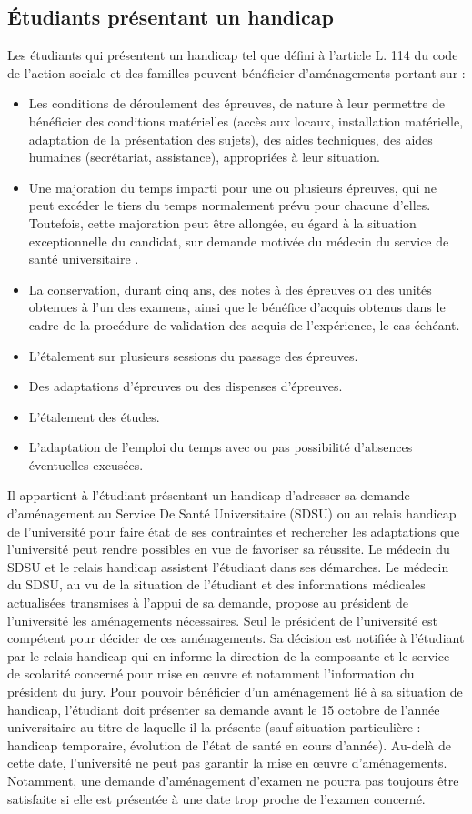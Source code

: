 \documentclass[a4paper,11pt]{article}
\begin{document}
\subsection{Étudiants présentant un handicap}\label{Handicap}
Les étudiants qui présentent un handicap tel que défini à l'article L. 114 du code de l'action sociale et des familles peuvent bénéficier d'aménagements portant sur :
\begin{itemize}
	\item Les conditions de déroulement des épreuves, de nature à leur permettre de bénéficier des conditions matérielles (accès aux locaux, installation matérielle, adaptation de la présentation des sujets), des aides techniques, des aides humaines (secrétariat, assistance), appropriées à leur situation.
	\item Une majoration du temps imparti pour une ou plusieurs épreuves, qui ne peut excéder le tiers du temps normalement prévu pour chacune d'elles. Toutefois, cette majoration peut être allongée, eu égard à la situation exceptionnelle du candidat, sur demande motivée du médecin du service de santé universitaire .
	\item La conservation, durant cinq ans, des notes à des épreuves ou des unités obtenues à l'un des examens, ainsi que le bénéfice d'acquis obtenus dans le cadre de la procédure de validation des acquis de l'expérience, le cas échéant.
	\item L'étalement sur plusieurs sessions du passage des épreuves.
	\item Des adaptations d'épreuves ou des dispenses d'épreuves.
	\item L'étalement des études.
	\item L'adaptation de l'emploi du temps avec ou pas possibilité d'absences éventuelles excusées.
\end{itemize}

Il appartient à l'étudiant présentant un handicap d'adresser sa demande d'aménagement au Service De Santé Universitaire (SDSU) ou au relais handicap de l'université pour faire état de ses contraintes et rechercher les adaptations que l'université peut rendre possibles en vue de favoriser sa réussite. Le médecin du SDSU et le relais handicap assistent l'étudiant dans ses démarches. Le médecin du SDSU, au vu de la situation de l'étudiant et des informations médicales actualisées transmises à l'appui de sa demande, propose au président de l'université les aménagements nécessaires. Seul le président de l'université est compétent pour décider de ces aménagements. Sa décision est notifiée à l'étudiant par le relais handicap qui en informe la direction de la composante et le service de scolarité concerné pour mise en \oe uvre et notamment l'information du président du jury.
Pour pouvoir bénéficier d'un aménagement lié à sa situation de handicap, l'étudiant doit présenter sa demande avant le 15 octobre de l'année universitaire au titre de laquelle il la présente (sauf situation particulière : handicap temporaire, évolution de l'état de santé en cours d'année). Au-delà de cette date, l'université ne peut pas garantir la mise en \oe uvre d'aménagements. Notamment, une demande d'aménagement d'examen ne pourra pas toujours être satisfaite si elle est présentée à une date trop proche de l'examen concerné.
\end{document}

